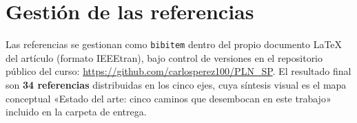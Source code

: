 \documentclass[11pt,a4paper]{article}
\begin{document}
\section{Gestión de las referencias}

Las referencias se gestionan como \texttt{bibitem} dentro del propio
documento LaTeX del artículo (formato IEEEtran), bajo control de versiones
en el repositorio público del curso:
\url{https://github.com/carlosperez100/PLN_SP}. El resultado final son
\textbf{34 referencias} distribuidas en los cinco ejes, cuya síntesis
visual es el mapa conceptual «Estado del arte: cinco caminos que desembocan
en este trabajo» incluido en la carpeta de entrega.
\end{document}
